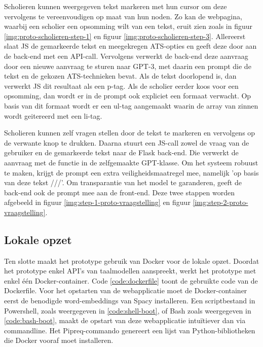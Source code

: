 \medspace

Scholieren kunnen weergegeven tekst markeren met hun cursor om deze vervolgens te vereenvoudigen op maat van hun noden. Zo kan de webpagina, waarbij een scholier een opsomming wilt van een tekst, eruit zien zoals in figuur \ref{img:proto-scholieren-step-1} en figuur \ref{img:proto-scholieren-step-3}. Allereerst slaat JS de gemarkeerde tekst en meegekregen ATS-opties en geeft deze door aan de back-end met een API-call. Vervolgens verwerkt de back-end deze aanvraag door een nieuwe aanvraag te sturen naar GPT-3, met daarin een prompt die de tekst en de gekozen ATS-technieken bevat. Als de tekst doorlopend is, dan verwerkt JS dit resultaat als een p-tag. Als de scholier eerder koos voor een opsomming, dan wordt er in de prompt ook expliciet een formaat verwacht. Op basis van dit formaat wordt er een ul-tag aangemaakt waarin de array van zinnen wordt geitereerd met een li-tag. 

\medspace

Scholieren kunnen zelf vragen stellen door de tekst te markeren en vervolgens op de verwante knop te drukken. Daarna stuurt een JS-call zowel de vraag van de gebruiker en de gemarkeerde tekst naar de Flask back-end. Die verwerkt de aanvraag met de functie in de zelfgemaakte GPT-klasse. Om het systeem robuust te maken, krijgt de prompt een extra veiligheidsmaatregel mee, namelijk 'op basis van deze tekst ///'. Om transparantie van het model te garanderen, geeft de back-end ook de prompt mee aan de front-end. Deze twee stappen worden afgebeeld in figuur \ref{img:step-1-proto-vraagstelling} en figuur \ref{img:step-2-proto-vraagstelling}.

\medspace

\subsection{Lokale opzet}

Ten slotte maakt het prototype gebruik van Docker voor de lokale opzet. Doordat het prototype enkel API's van taalmodellen aanspreekt, werkt het prototype met enkel één Docker-container. Code \ref{code:dockerfile} toont de gebruikte code van de Dockerfile. Voor het opstarten van de webapplicatie moet de Docker-container eerst de benodigde word-embeddings van Spacy installeren. Een scriptbestand in Powershell, zoals weergegeven in \ref{code:shell-boot}, of Bash zoals weergegeven in \ref{code:bash-boot}, maakt de opstart van deze webapplicatie intuïtiever dan via commandline. Het Pipreq-commando genereert een lijst van Python-bibliotheken die Docker vooraf moet installeren. 